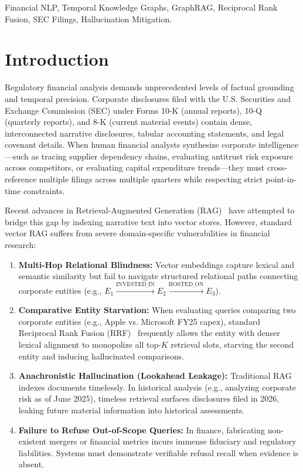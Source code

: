 \documentclass[conference]{IEEEtran}
\begin{document}
\begin{IEEEkeywords}
Financial NLP, Temporal Knowledge Graphs, GraphRAG, Reciprocal Rank Fusion, SEC Filings, Hallucination Mitigation.
\end{IEEEkeywords}

\section{Introduction}
Regulatory financial analysis demands unprecedented levels of factual grounding and temporal precision. Corporate disclosures filed with the U.S. Securities and Exchange Commission (SEC) under Forms 10-K (annual reports), 10-Q (quarterly reports), and 8-K (current material events) contain dense, interconnected narrative disclosures, tabular accounting statements, and legal covenant details. When human financial analysts synthesize corporate intelligence---such as tracing supplier dependency chains, evaluating antitrust risk exposure across competitors, or evaluating capital expenditure trends---they must cross-reference multiple filings across multiple quarters while respecting strict point-in-time constraints.

Recent advances in Retrieval-Augmented Generation (RAG)~\cite{lewis2020rag} have attempted to bridge this gap by indexing narrative text into vector stores. However, standard vector RAG suffers from severe domain-specific vulnerabilities in financial research:
\begin{enumerate}
    \item \textbf{Multi-Hop Relational Blindness:} Vector embeddings capture lexical and semantic similarity but fail to navigate structured relational paths connecting corporate entities (e.g., $E_1 \xrightarrow{\text{INVESTED\_IN}} E_2 \xrightarrow{\text{HOSTED\_ON}} E_3$).
    \item \textbf{Comparative Entity Starvation:} When evaluating queries comparing two corporate entities (e.g., Apple vs. Microsoft FY25 capex), standard Reciprocal Rank Fusion (RRF)~\cite{cormack2009rrf} frequently allows the entity with denser lexical alignment to monopolize all top-$K$ retrieval slots, starving the second entity and inducing hallucinated comparisons.
    \item \textbf{Anachronistic Hallucination (Lookahead Leakage):} Traditional RAG indexes documents timelessly. In historical analysis (e.g., analyzing corporate risk as of June 2025), timeless retrieval surfaces disclosures filed in 2026, leaking future material information into historical assessments.
    \item \textbf{Failure to Refuse Out-of-Scope Queries:} In finance, fabricating non-existent mergers or financial metrics incurs immense fiduciary and regulatory liabilities. Systems must demonstrate verifiable refusal recall when evidence is absent.
\end{enumerate}
\end{document}
